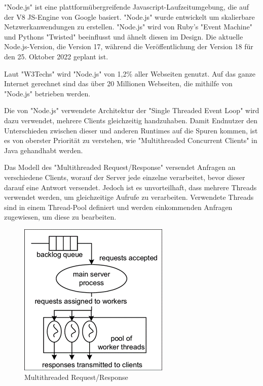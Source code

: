 \label{sec:nodejs}
"Node.js" ist eine plattformübergreifende Javascript-Laufzeitumgebung, die auf der V8 JS-Engine von Google basiert. "Node.js" wurde entwickelt um skalierbare Netzwerkanwendungen zu erstellen. "Node.js" wird von Ruby's "Event Machine" und Pythons "Twisted" beeinflusst und ähnelt diesen im Design. Die aktuelle Node.js-Version, die Version 17, während die Veröffentlichung der Version 18 für den 25. Oktober 2022 geplant ist. \cite{NodeInfo}

Laut "W3Techs" wird "Node.js" von 1,2\% aller Webseiten genutzt. Auf das ganze Internet gerechnet sind das über 20 Millionen Webseiten, die mithilfe von "Node.js" betrieben werden. \cite{NodeInfo} \cite{Node}

Die von "Node.js" verwendete Architektur der "Single Threaded Event Loop" wird dazu verwendet, mehrere Clients gleichzeitig handzuhaben. Damit Endnutzer den  Unterschieden zwischen dieser und anderen Runtimes auf die Spuren kommen, ist es von oberster Priorität zu verstehen, wie "Multithreaded Concurrent Clients" in Java gehandhabt werden. \cite{NodeJs.dev}


Das Modell des "Multithreaded Request/Response" versendet Anfragen an verschiedene Clients, worauf der Server jede einzelne verarbeitet, bevor dieser darauf eine Antwort versendet. Jedoch ist es unvorteilhaft, dass mehrere Threads verwendet werden, um gleichzeitige Aufrufe zu verarbeiten. Verwendete Threads sind in einem Thread-Pool definiert und werden einkommenden Anfragen zugewiesen, um diese zu bearbeiten. \cite{Arocom}



\begin{figure}[H]
    \centering
    \includegraphics{media/NodeJs/MultiThreadedRequestResponse.png}
    \caption{Multithreaded Request/Response \cite{Multithreaded}}
\end{figure}

